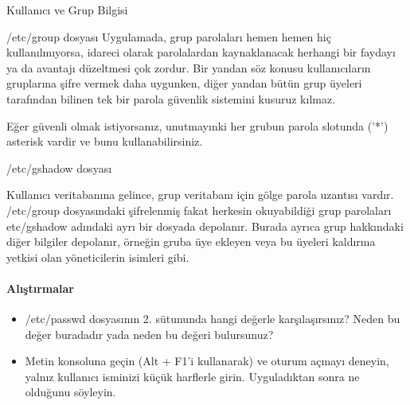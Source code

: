 \begin{section}{Kullanıcı ve Grup Bilgisi}
\begin{subsection}{/etc/group dosyası}
Uygulamada, grup parolaları hemen hemen hiç kullanılmıyorsa, idareci olarak parolalardan kaynaklanacak herhangi bir faydayı ya da avantajı düzeltmesi çok zordur. Bir yandan söz konusu kullanıcıların gruplarına şifre vermek daha uygunken, diğer yandan bütün grup üyeleri tarafından bilinen tek bir parola güvenlik sistemini kusuruz kılmaz.

Eğer güvenli olmak istiyorsanız, unutmayınki her grubun parola slotunda ('*') asterisk vardir ve bunu kullanabilirsiniz.
\end{subsection}
\begin{subsection}{/etc/gshadow dosyası}

Kullanıcı veritabanına gelince, grup veritabanı için gölge parola uzantısı vardır. /etc/group dosyasındaki şifrelenmiş fakat herkesin okuyabildiği grup parolaları etc/gshadow adındaki ayrı bir dosyada depolanır. Burada ayrıca grup hakkındaki diğer bilgiler depolanır, örneğin gruba üye ekleyen veya bu üyeleri kaldırma yetkisi olan yöneticilerin isimleri gibi.
\end{subsection}
\paragraph{Alıştırmalar}{
\begin{itemize}
\item /etc/passwd dosyasının 2. sütununda hangi değerle karşılaşırsınız? Neden bu değer buradadır yada neden bu değeri bulursunuz?
\item Metin konsoluna geçin (Alt + F1'i kullanarak) ve oturum açmayı deneyin, yalnız kullanıcı isminizi küçük harflerle girin. Uyguladıktan sonra ne olduğunu söyleyin.
\end{itemize}
}
\end{section}
